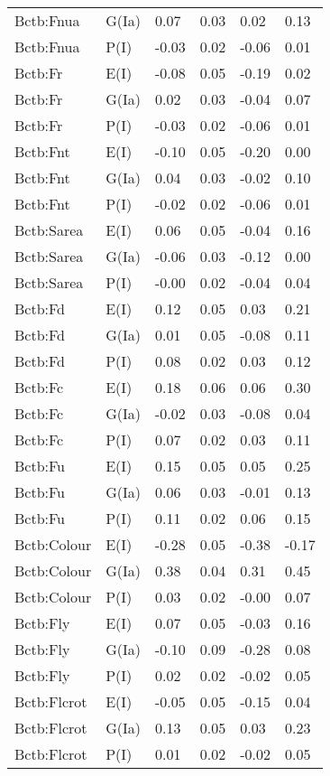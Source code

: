 \begin{center}
\begin{longtable}{|p{1.1in}|p{0.7in}|p{0.7in}|p{0.6in}|p{0.6in}|p{0.6in}|}
  Bctb:Fnua & G(Ia) & 0.07 & 0.03 & 0.02 & 0.13 \\ 
  Bctb:Fnua & P(I) & -0.03 & 0.02 & -0.06 & 0.01 \\ 
  Bctb:Fr & E(I) & -0.08 & 0.05 & -0.19 & 0.02 \\ 
  Bctb:Fr & G(Ia) & 0.02 & 0.03 & -0.04 & 0.07 \\ 
  Bctb:Fr & P(I) & -0.03 & 0.02 & -0.06 & 0.01 \\ 
  Bctb:Fnt & E(I) & -0.10 & 0.05 & -0.20 & 0.00 \\ 
  Bctb:Fnt & G(Ia) & 0.04 & 0.03 & -0.02 & 0.10 \\ 
  Bctb:Fnt & P(I) & -0.02 & 0.02 & -0.06 & 0.01 \\ 
  Bctb:Sarea & E(I) & 0.06 & 0.05 & -0.04 & 0.16 \\ 
  Bctb:Sarea & G(Ia) & -0.06 & 0.03 & -0.12 & 0.00 \\ 
  Bctb:Sarea & P(I) & -0.00 & 0.02 & -0.04 & 0.04 \\ 
  Bctb:Fd & E(I) & 0.12 & 0.05 & 0.03 & 0.21 \\ 
  Bctb:Fd & G(Ia) & 0.01 & 0.05 & -0.08 & 0.11 \\ 
  Bctb:Fd & P(I) & 0.08 & 0.02 & 0.03 & 0.12 \\ 
  Bctb:Fc & E(I) & 0.18 & 0.06 & 0.06 & 0.30 \\ 
  Bctb:Fc & G(Ia) & -0.02 & 0.03 & -0.08 & 0.04 \\ 
  Bctb:Fc & P(I) & 0.07 & 0.02 & 0.03 & 0.11 \\ 
  Bctb:Fu & E(I) & 0.15 & 0.05 & 0.05 & 0.25 \\ 
  Bctb:Fu & G(Ia) & 0.06 & 0.03 & -0.01 & 0.13 \\ 
  Bctb:Fu & P(I) & 0.11 & 0.02 & 0.06 & 0.15 \\ 
  Bctb:Colour & E(I) & -0.28 & 0.05 & -0.38 & -0.17 \\ 
  Bctb:Colour & G(Ia) & 0.38 & 0.04 & 0.31 & 0.45 \\ 
  Bctb:Colour & P(I) & 0.03 & 0.02 & -0.00 & 0.07 \\ 
  Bctb:Fly & E(I) & 0.07 & 0.05 & -0.03 & 0.16 \\ 
  Bctb:Fly & G(Ia) & -0.10 & 0.09 & -0.28 & 0.08 \\ 
  Bctb:Fly & P(I) & 0.02 & 0.02 & -0.02 & 0.05 \\ 
  Bctb:Flcrot & E(I) & -0.05 & 0.05 & -0.15 & 0.04 \\ 
  Bctb:Flcrot & G(Ia) & 0.13 & 0.05 & 0.03 & 0.23 \\ 
  Bctb:Flcrot & P(I) & 0.01 & 0.02 & -0.02 & 0.05 \\ 

\end{longtable}
\end{center}
